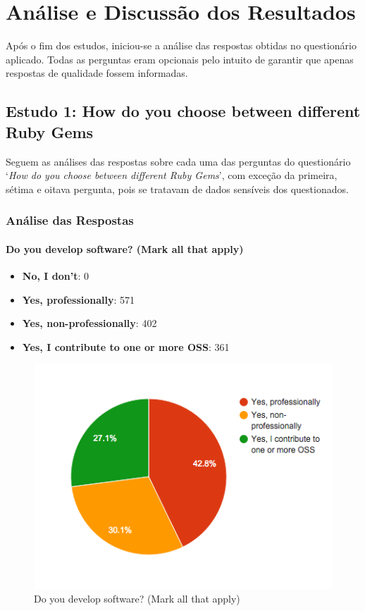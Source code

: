 \chapter{Análise e Discussão dos Resultados}

Após o fim dos estudos, iniciou-se a análise das respostas obtidas no questionário aplicado. Todas as perguntas eram opcionais pelo intuito de garantir que apenas respostas de qualidade fossem informadas.

\section{Estudo 1: How do you choose between different Ruby Gems}

Seguem as análises das respostas sobre cada uma das perguntas do questionário `\textit{How do you choose between different Ruby Gems}', com exceção da primeira, sétima e oitava pergunta, pois se tratavam de dados sensíveis dos questionados. 

\subsection{Análise das Respostas}


  \subsubsection{Do you develop software? (Mark all that apply)}

  \begin{itemize}
    \item \textbf{No, I don't}: 0
    \item \textbf{Yes, professionally}: 571
    \item \textbf{Yes, non-professionally}: 402
    \item \textbf{Yes, I contribute to one or more OSS}: 361
  \end{itemize}
  
  \begin{figure}[H]
	\centering
    \includegraphics[width=15cm]{Imagens/do-you-develop.png}
    \caption{Do you develop software? (Mark all that apply)}
  \end{figure}
  
